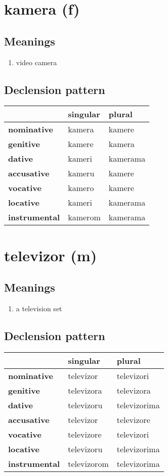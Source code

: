 \filbreak
\section{kamera (f)}
\subsection*{Meanings}
\begin{enumerate}
\item video camera
\end{enumerate}
\subsection*{Declension pattern}
\begin{tabularx}{\linewidth}{Xll}
\toprule
{} & singular &    plural \\
\midrule
\textbf{nominative  } &   kamera &    kamere \\
\textbf{genitive    } &   kamere &    kamera \\
\textbf{dative      } &   kameri &  kamerama \\
\textbf{accusative  } &   kameru &    kamere \\
\textbf{vocative    } &   kamero &    kamere \\
\textbf{locative    } &   kameri &  kamerama \\
\textbf{instrumental} &  kamerom &  kamerama \\
\bottomrule
\end{tabularx}

\filbreak
\section{televizor (m)}
\subsection*{Meanings}
\begin{enumerate}
\item a television set
\end{enumerate}
\subsection*{Declension pattern}
\begin{tabularx}{\linewidth}{Xll}
\toprule
{} &     singular &        plural \\
\midrule
\textbf{nominative  } &    televizor &    televizori \\
\textbf{genitive    } &   televizora &    televizora \\
\textbf{dative      } &   televizoru &  televizorima \\
\textbf{accusative  } &    televizor &    televizore \\
\textbf{vocative    } &   televizore &    televizori \\
\textbf{locative    } &   televizoru &  televizorima \\
\textbf{instrumental} &  televizorom &  televizorima \\
\bottomrule
\end{tabularx}

